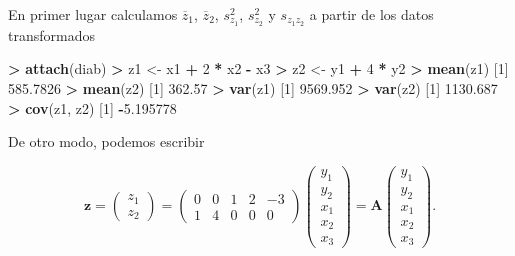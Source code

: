 \documentclass[
  a4paper,
  oneside]{scrbook}
\newenvironment{Shaded}{\begin{snugshade}}{\end{snugshade}}
\newcommand{\DecValTok}[1]{\textcolor[rgb]{0.00,0.00,0.81}{#1}}
\newcommand{\FloatTok}[1]{\textcolor[rgb]{0.00,0.00,0.81}{#1}}
\newcommand{\FunctionTok}[1]{\textcolor[rgb]{0.13,0.29,0.53}{\textbf{#1}}}
\newcommand{\NormalTok}[1]{#1}
\newcommand{\OtherTok}[1]{\textcolor[rgb]{0.56,0.35,0.01}{#1}}
\newcommand{\SpecialCharTok}[1]{\textcolor[rgb]{0.81,0.36,0.00}{\textbf{#1}}}
\theoremstyle{definition}
\theoremstyle{definition}
\theoremstyle{definition}
\theoremstyle{definition}
\theoremstyle{remark}
\begin{document}
En primer lugar calculamos \(\overline{z}_1\), \(\overline{z}_2\),
\(s^2_{z_1}\), \(s^2_{z_2}\) y \(s_{z_1z_2}\) a partir de los datos
transformados

\footnotesize

\begin{Shaded}
\begin{Highlighting}[]
\SpecialCharTok{\textgreater{}} \FunctionTok{attach}\NormalTok{(diab)}
\SpecialCharTok{\textgreater{}}\NormalTok{ z1 }\OtherTok{\textless{}{-}}\NormalTok{ x1 }\SpecialCharTok{+} \DecValTok{2} \SpecialCharTok{*}\NormalTok{ x2 }\SpecialCharTok{{-}}\NormalTok{ x3}
\SpecialCharTok{\textgreater{}}\NormalTok{ z2 }\OtherTok{\textless{}{-}}\NormalTok{ y1 }\SpecialCharTok{+} \DecValTok{4} \SpecialCharTok{*}\NormalTok{ y2}
\SpecialCharTok{\textgreater{}} \FunctionTok{mean}\NormalTok{(z1)}
\NormalTok{[}\DecValTok{1}\NormalTok{] }\FloatTok{585.7826}
\SpecialCharTok{\textgreater{}} \FunctionTok{mean}\NormalTok{(z2)}
\NormalTok{[}\DecValTok{1}\NormalTok{] }\FloatTok{362.57}
\SpecialCharTok{\textgreater{}} \FunctionTok{var}\NormalTok{(z1)}
\NormalTok{[}\DecValTok{1}\NormalTok{] }\FloatTok{9569.952}
\SpecialCharTok{\textgreater{}} \FunctionTok{var}\NormalTok{(z2)}
\NormalTok{[}\DecValTok{1}\NormalTok{] }\FloatTok{1130.687}
\SpecialCharTok{\textgreater{}} \FunctionTok{cov}\NormalTok{(z1, z2)}
\NormalTok{[}\DecValTok{1}\NormalTok{] }\SpecialCharTok{{-}}\FloatTok{5.195778}
\end{Highlighting}
\end{Shaded}

\normalsize

De otro modo, podemos escribir

\[\bm{z}=\left(\begin{array}{c}z_1\\z_2\end{array}\right)=\left(\begin{array}{ccccc}0&0&1&2&-3\\1&4&0&0&0\end{array}\right)\left(\begin{array}{c}y_1\\y_2\\x_1\\x_2\\x_3\end{array}\right)=\bm{A}\left(\begin{array}{c}y_1\\y_2\\x_1\\x_2\\x_3\end{array}\right).\]
\end{document}
